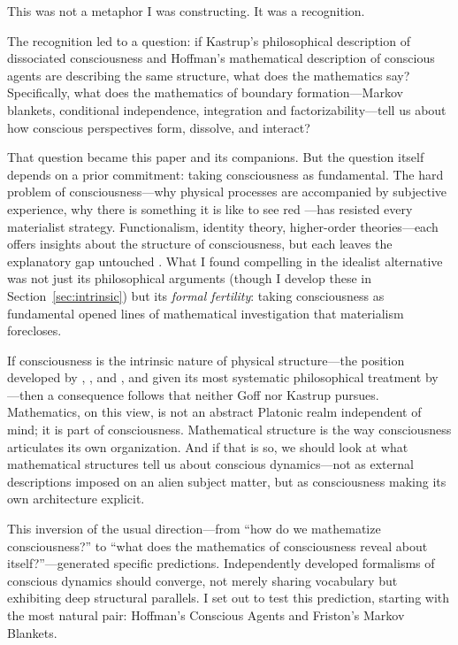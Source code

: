 \documentclass[11pt,a4paper]{article}
\theoremstyle{definition}
\theoremstyle{plain}
\theoremstyle{remark}
\begin{document}
This was not a metaphor I was constructing. It was a recognition.

The recognition led to a question: if Kastrup's philosophical description of dissociated consciousness and Hoffman's mathematical description of conscious agents are describing the same structure, what does the mathematics say? Specifically, what does the mathematics of boundary formation---Markov blankets, conditional independence, integration and factorizability---tell us about how conscious perspectives form, dissolve, and interact?

That question became this paper and its companions. But the question itself depends on a prior commitment: taking consciousness as fundamental. The hard problem of consciousness---why physical processes are accompanied by subjective experience, why there is something it is like to see red \citep{Chalmers1995,Chalmers1996}---has resisted every materialist strategy. Functionalism, identity theory, higher-order theories---each offers insights about the structure of consciousness, but each leaves the explanatory gap untouched \citep{Dennett1991}. What I found compelling in the idealist alternative was not just its philosophical arguments (though I develop these in Section~\ref{sec:intrinsic}) but its \textit{formal fertility}: taking consciousness as fundamental opened lines of mathematical investigation that materialism forecloses.

If consciousness is the intrinsic nature of physical structure---the position developed by \citet{Russell1927}, \citet{Strawson2006}, and \citet{Goff2017}, and given its most systematic philosophical treatment by \citet{Kastrup2019}---then a consequence follows that neither Goff nor Kastrup pursues. Mathematics, on this view, is not an abstract Platonic realm independent of mind; it is part of consciousness. Mathematical structure is the way consciousness articulates its own organization. And if that is so, we should look at what mathematical structures tell us about conscious dynamics---not as external descriptions imposed on an alien subject matter, but as consciousness making its own architecture explicit.

This inversion of the usual direction---from ``how do we mathematize consciousness?'' to ``what does the mathematics of consciousness reveal about itself?''---generated specific predictions. Independently developed formalisms of conscious dynamics should converge, not merely sharing vocabulary but exhibiting deep structural parallels. I set out to test this prediction, starting with the most natural pair: Hoffman's Conscious Agents and Friston's Markov Blankets.
\end{document}

